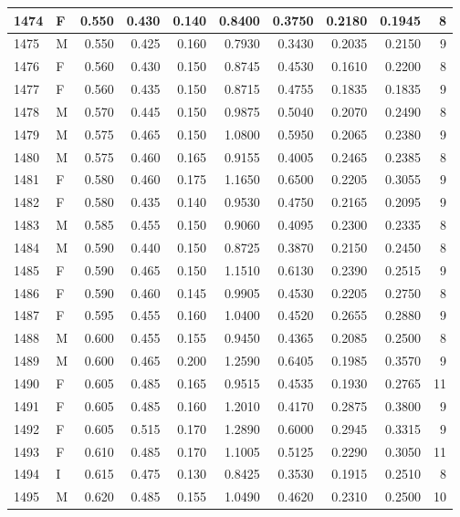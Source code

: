 \documentclass[9pt,twocolumn,twoside,]{pnas-new}
\begin{document}
\begin{tabular}{l|l|r|r|r|r|r|r|r|r}
\hline
1474 & F & 0.550 & 0.430 & 0.140 & 0.8400 & 0.3750 & 0.2180 & 0.1945 & 8\\
\hline
1475 & M & 0.550 & 0.425 & 0.160 & 0.7930 & 0.3430 & 0.2035 & 0.2150 & 9\\
\hline
1476 & F & 0.560 & 0.430 & 0.150 & 0.8745 & 0.4530 & 0.1610 & 0.2200 & 8\\
\hline
1477 & F & 0.560 & 0.435 & 0.150 & 0.8715 & 0.4755 & 0.1835 & 0.1835 & 9\\
\hline
1478 & M & 0.570 & 0.445 & 0.150 & 0.9875 & 0.5040 & 0.2070 & 0.2490 & 8\\
\hline
1479 & M & 0.575 & 0.465 & 0.150 & 1.0800 & 0.5950 & 0.2065 & 0.2380 & 9\\
\hline
1480 & M & 0.575 & 0.460 & 0.165 & 0.9155 & 0.4005 & 0.2465 & 0.2385 & 8\\
\hline
1481 & F & 0.580 & 0.460 & 0.175 & 1.1650 & 0.6500 & 0.2205 & 0.3055 & 9\\
\hline
1482 & F & 0.580 & 0.435 & 0.140 & 0.9530 & 0.4750 & 0.2165 & 0.2095 & 9\\
\hline
1483 & M & 0.585 & 0.455 & 0.150 & 0.9060 & 0.4095 & 0.2300 & 0.2335 & 8\\
\hline
1484 & M & 0.590 & 0.440 & 0.150 & 0.8725 & 0.3870 & 0.2150 & 0.2450 & 8\\
\hline
1485 & F & 0.590 & 0.465 & 0.150 & 1.1510 & 0.6130 & 0.2390 & 0.2515 & 9\\
\hline
1486 & F & 0.590 & 0.460 & 0.145 & 0.9905 & 0.4530 & 0.2205 & 0.2750 & 8\\
\hline
1487 & F & 0.595 & 0.455 & 0.160 & 1.0400 & 0.4520 & 0.2655 & 0.2880 & 9\\
\hline
1488 & M & 0.600 & 0.455 & 0.155 & 0.9450 & 0.4365 & 0.2085 & 0.2500 & 8\\
\hline
1489 & M & 0.600 & 0.465 & 0.200 & 1.2590 & 0.6405 & 0.1985 & 0.3570 & 9\\
\hline
1490 & F & 0.605 & 0.485 & 0.165 & 0.9515 & 0.4535 & 0.1930 & 0.2765 & 11\\
\hline
1491 & F & 0.605 & 0.485 & 0.160 & 1.2010 & 0.4170 & 0.2875 & 0.3800 & 9\\
\hline
1492 & F & 0.605 & 0.515 & 0.170 & 1.2890 & 0.6000 & 0.2945 & 0.3315 & 9\\
\hline
1493 & F & 0.610 & 0.485 & 0.170 & 1.1005 & 0.5125 & 0.2290 & 0.3050 & 11\\
\hline
1494 & I & 0.615 & 0.475 & 0.130 & 0.8425 & 0.3530 & 0.1915 & 0.2510 & 8\\
\hline
1495 & M & 0.620 & 0.485 & 0.155 & 1.0490 & 0.4620 & 0.2310 & 0.2500 & 10\\

\end{tabular}
\end{document}
